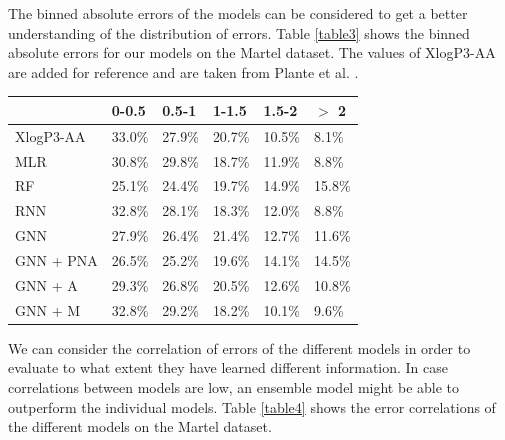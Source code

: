 \documentclass{article}
\theoremstyle{definition}
\theoremstyle{remark}
\begin{document}
The binned absolute errors of the models can be considered to get a better understanding of the distribution of errors. Table \ref{table3} shows the binned absolute errors for our models on the Martel dataset. The values of XlogP3-AA are added for reference and are taken from Plante et al. \cite{plante2018jplogp}. \\

\begin{center}
\begin{tabular}{ | m{2.0cm} | m{1.0cm}| m{1.0cm}| m{1.0cm}| m{1.0cm}| m{1.0cm}| } 
  \hline
   & 0-0.5 & 0.5-1 & 1-1.5 & 1.5-2 & $>$ 2  \\ 
   \hline
   XlogP3-AA & 33.0\% & 27.9\% & 20.7\% & 10.5\% & 8.1\%  \\
  \hline
   MLR & 30.8\% & 29.8\% & 18.7\% & 11.9\% & 8.8\%  \\ 
  \hline
  RF & 25.1\% & 24.4\% & 19.7\% & 14.9\% & 15.8\%  \\ 
  \hline
  RNN & 32.8\% & 28.1\% & 18.3\% & 12.0\% & 8.8\%  \\ 
  \hline
  GNN & 27.9\% & 26.4\% & 21.4\% & 12.7\% & 11.6\%  \\ 
  \hline
  GNN + PNA & 26.5\% & 25.2\% & 19.6\% & 14.1\% & 14.5\%  \\ 
  \hline
  GNN + A & 29.3\% & 26.8\% & 20.5\% & 12.6\% & 10.8\% \\ 
  \hline
  GNN + M & 32.8\% & 29.2\% & 18.2\% & 10.1\% & 9.6\% \\ 
  \hline

\end{tabular}
\captionsetup{width=0.8\textwidth}
\label{table3}
\end{center}

We can consider the correlation of errors of the different models in order to evaluate to what extent they have learned different information. In case correlations between models are low, an ensemble model might be able to outperform the individual models. Table \ref{table4} shows the error correlations of the different models on the Martel dataset.\\
\end{document}
